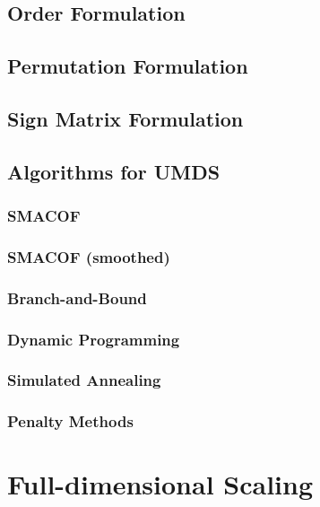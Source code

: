\documentclass[
  12pt,
]{book}
\begin{document}
\section{Order Formulation}\label{order-formulation}

\section{Permutation Formulation}\label{permutation-formulation}

\section{Sign Matrix Formulation}\label{sign-matrix-formulation}

\section{Algorithms for UMDS}\label{unialgorithms}

\subsection{SMACOF}\label{unismacof}

\subsection{SMACOF (smoothed)}\label{unismoothed}

\subsection{Branch-and-Bound}\label{unibranchbound}

\subsection{Dynamic Programming}\label{unidynamic}

\subsection{Simulated Annealing}\label{uniannealing}

\subsection{Penalty Methods}\label{unipenalty}

\chapter{Full-dimensional Scaling}\label{fullchapter}
\end{document}
